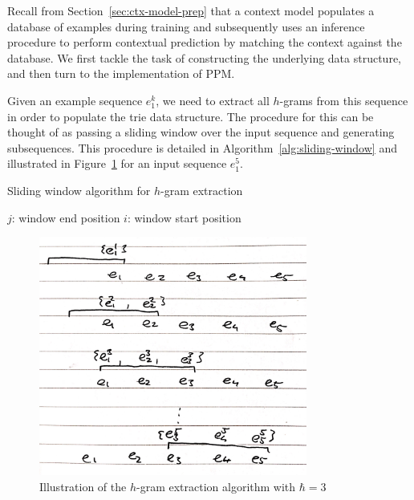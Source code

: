 \documentclass[12pt,a4paper,twoside,openright]{report}
\begin{document}
Recall from Section~\ref{sec:ctx-model-prep} that a context model populates a
database of examples during training and subsequently uses an inference
procedure to perform contextual prediction by matching the context against the
database. We first tackle the task of constructing the underlying data
structure, and then turn to the implementation of PPM.

Given an example sequence $e_1^k$, we need to extract all $h$-grams from this
sequence in order to populate the trie data structure. The procedure for this
can be thought of as passing a sliding window over the input sequence and
generating subsequences. This procedure is detailed in
Algorithm~\ref{alg:sliding-window} and illustrated in
Figure~\ref{fig:hgram-extract} for an input sequence $e_1^5$.

\vspace{4mm}

\begin{algorithm}[H]
  \caption{Sliding window algorithm for $h$-gram extraction}
  \label{alg:sliding-window}
  \begin{algorithmic}[1]
      \Comment $j$: window end position
        \State {}
        \Comment $i$: window start position
          \State {}
        \EndFor
      \EndFor
    \EndFunction
  \end{algorithmic}
\end{algorithm}

\begin{figure}[H]
\centering
\includegraphics[width=250pt]{figs/sliding_window_tmp.jpg}
\caption{Illustration of the $h$-gram extraction algorithm with $\hbar = 3$}
\label{fig:hgram-extract}
\end{figure}
\end{document}
